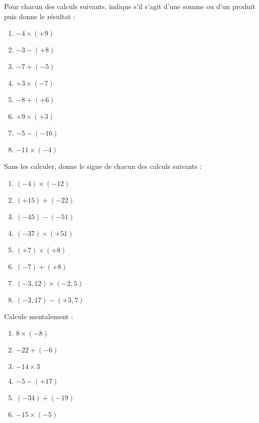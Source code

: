 


\begin{exercice}Pour chacun des calculs suivants, indique s'il s'agit d'une somme ou d'un produit puis donne le résultat :
\begin{enumerate}
\item $-4 \times (+9)$
\item $-3 -(+8)$
\item $-7 +(-5)$
\item $+3 \times (-7)$
\item $-8 +(+6)$
\item $+9 \times (+3)$
\item $-5 -(-16)$
\item $-11 \times (-4)$
\end{enumerate}
\end{exercice}



\begin{exercice}Sans les calculer, donne le signe de chacun des calculs suivants :
\begin{enumerate}
\item $(-4) \times (-12)$
\item $(+15) +(-22)$
\item $(-45) -(-51)$
\item $(-37) \times (+51)$
\item $(+7) \times (+8)$
\item $(-7) +(+8)$
\item $(-3,12) \times (-2,5)$
\item $(-3,17) -(+3,7)$
\end{enumerate}
\end{exercice}



\begin{exercice}Calcule mentalement :
\begin{enumerate}
\item $8 \times (-8)$
\item $-22 +(-6)$
\item $-14 \times 3$
\item $-5 -(+17)$
\item $(-34) +(-19)$
\item $-15 \times (-5)$
\end{enumerate}
\end{exercice}



